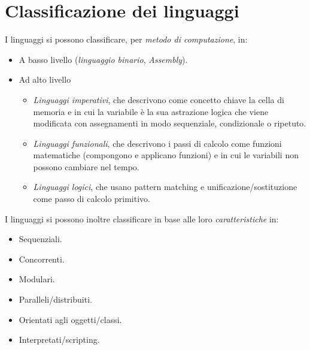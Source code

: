 \documentclass[a4paper,oneside,titlepage]{book}
\begin{document}
\section{Classificazione dei linguaggi}
I linguaggi si possono classificare, per \textit{metodo di computazione}, in:
\begin{itemize}
	\item A basso livello (\textit{linguaggio binario}, \textit{Assembly}).
	\item Ad alto livello
		\begin{itemize}
			\item \textit{Linguaggi imperativi}, che descrivono come concetto chiave la cella di memoria e in cui la variabile è la sua astrazione logica che viene modificata con assegnamenti in modo sequenziale, condizionale o ripetuto.
			\item \textit{Linguaggi funzionali}, che descrivono i passi di calcolo come funzioni matematiche (compongono e applicano funzioni) e in cui le variabili non possono cambiare nel tempo.
			\item \textit{Linguaggi logici}, che usano pattern matching e unificazione/sostituzione come passo di calcolo primitivo.
		\end{itemize}
\end{itemize}
I linguaggi si possono inoltre classificare in base alle loro \textit{caratteristiche} in:
\begin{itemize}
	\item Sequenziali.
	\item Concorrenti.
	\item Modulari.
	\item Paralleli/distribuiti.
	\item Orientati agli oggetti/classi.
	\item Interpretati/scripting.
\end{itemize}
\end{document}
